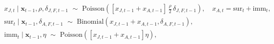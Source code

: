 \begin{gather}
    x_{J, t} \mid \boldsymbol{x}_{t - 1}, \rho, \delta_{J, F, t - 1} 
    \,\, \sim \,\,
    \text{Poisson}\left(
      \left[x_{J, t - 1} + x_{A, t - 1}\right]
      \, \frac{\rho}{2} \,
      \delta_{J, F, t - 1} 
    \right),
    \quad 
    x_{A, t} = \text{sur}_{t} + \text{imm}_{t}, \\
    \text{sur}_{t} \mid \boldsymbol{x}_{t - 1}, \delta_{A, F, t - 1}
    \,\, \sim \,\,
    \text{Binomial}\left(
      x_{J, t - 1} + x_{A, t - 1},
      \delta_{A, F, t - 1}
    \right), \\
    \text{imm}_{t} \mid \boldsymbol{x}_{t - 1}, \eta 
    \,\, \sim\,\,
    \text{Poisson}\left(
      \left[x_{J, t - 1} + x_{A, t - 1}\right] \eta\right
    ),
  \label{eqn:count-data-submodel}
\end{gather}